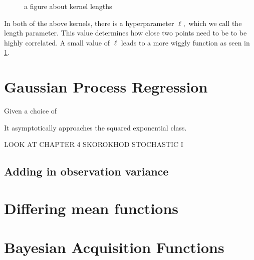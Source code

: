 \begin{figure}
    \caption{a figure about kernel lengths}
    \label{fig:no_reg_lengths}
\end{figure}

In both of the above kernels, there is a hyperparameter $\ell,$ which we call the length parameter. This value determines how close two points need to be to be highly correlated. A small value of $\ell$ leads to a more wiggly function as seen in \ref{fig:no_reg_lengths}.

\section{Gaussian Process Regression}

Given a choice of


\begin{figure}
\end{figure}


\begin{figure}
\end{figure}

It asymptotically approaches the squared exponential class.

LOOK AT CHAPTER 4 SKOROKHOD STOCHASTIC I

\subsection*{Adding in observation variance}

\begin{figure}
\end{figure}

\section{Differing mean functions}



\begin{figure}
\end{figure}

\section{Bayesian Acquisition Functions}

